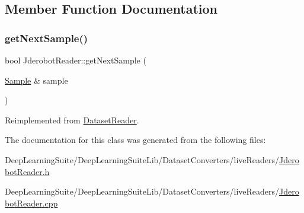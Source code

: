 \subsection{Member Function Documentation}
\mbox{\label{class_jderobot_reader_aef97b473c11e144fcf07e01c3181269b}} 
\subsubsection{\texorpdfstring{get\+Next\+Sample()}{getNextSample()}}
{\footnotesize\ttfamily bool Jderobot\+Reader\+::get\+Next\+Sample (\begin{DoxyParamCaption}\item[{\hyperlink{struct_sample}{Sample} \&}]{sample }\end{DoxyParamCaption})\hspace{0.3cm}{\ttfamily [virtual]}}



Reimplemented from \hyperlink{class_dataset_reader_af50668f52c34f4620c44e91f26dd11ce}{Dataset\+Reader}.



The documentation for this class was generated from the following files\+:\begin{DoxyCompactItemize}
\item 
Deep\+Learning\+Suite/\+Deep\+Learning\+Suite\+Lib/\+Dataset\+Converters/live\+Readers/\hyperlink{_jderobot_reader_8h}{Jderobot\+Reader.\+h}\item 
Deep\+Learning\+Suite/\+Deep\+Learning\+Suite\+Lib/\+Dataset\+Converters/live\+Readers/\hyperlink{_jderobot_reader_8cpp}{Jderobot\+Reader.\+cpp}\end{DoxyCompactItemize}
